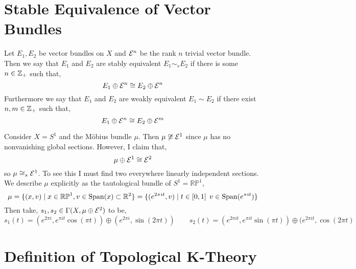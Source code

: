\documentclass[12pt]{extarticle}
\newcommand{\RP}{\mathbb{RP}}
\begin{document}
\section{Stable Equivalence of Vector Bundles}

\begin{definition}
Let $E_1, E_2$ be vector bundles on $X$ and $\mathcal{E}^n$ be the rank $n$ trivial vector bundle. Then we say that $E_1$ and $E_2$ are stably equivalent $E_1 \sim_s E_2$ if there is some $n \in \mathbb{Z}_+$ such that,
\[ E_1 \oplus \mathcal{E}^n \cong E_2 \oplus \mathcal{E}^n \]
Furthermore we say that $E_1$ and $E_2$ are weakly equivalent $E_1 \sim E_2$ if there exist $n,m \in \mathbb{Z}_+$ such that,
\[ E_1 \oplus \mathcal{E}^n \cong E_2 \oplus \mathcal{E}^m \]
\end{definition}

\begin{example}
Consider $X = S^1$ and the M\"{o}bius bundle $\mu$. Then $\mu \not\cong \mathcal{E}^1$ since $\mu$ has no nonvanishing global sections. However, I claim that,
\[ \mu \oplus \mathcal{E}^1 \cong \mathcal{E}^2 \]
so $\mu \cong_s \mathcal{E}^1$. To see this I must find two everywhere linearly independent sections. 
\bigskip\\
We describe $\mu$ explicitly as the tautological bundle of $S^1 = \RP^1$,
\[ \mu = \{ (x, v) \mid x \in \RP^1, v \in \mathrm{Span}(x) \subset \R^2 \} = \{ (e^{2 \pi i t}, v) \mid t \in [0, 1] \: \: v \in \mathrm{Span}(e^{\pi i t}) \} \]
Then take, $s_1, s_2 \in \Gamma(X, \mu \oplus \mathcal{E}^2)$ to be,
\[ s_1(t) = (e^{2 \pi i}, e^{\pi i t} \cos{(\pi t)}) \oplus (e^{2 \pi i}, \sin{(2 \pi t)}) \quad \quad s_2(t) = (e^{2 \pi i t}, e^{\pi i t} \sin{(\pi t)}) \oplus (e^{2 \pi i t}, \cos{(2 \pi t)}  \]
\end{example}

\section{Definition of Topological K-Theory}
\end{document}
